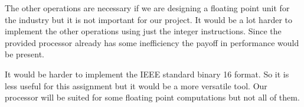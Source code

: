 \documentclass[conference]{IEEEtran}
\begin{document}
The other operations are necessary if we are designing a floating point unit for the industry but it is not
important for our project. It would be a lot harder to implement the other operations using just
the integer instructions. Since the provided processor already has some inefficiency the payoff in performance would be present.

It would be harder to implement the IEEE standard binary 16 format. So it is less useful for this assignment
 but it would be a more versatile tool. Our processor will be suited for some floating point computations but
 not all of them.

\end{document}
